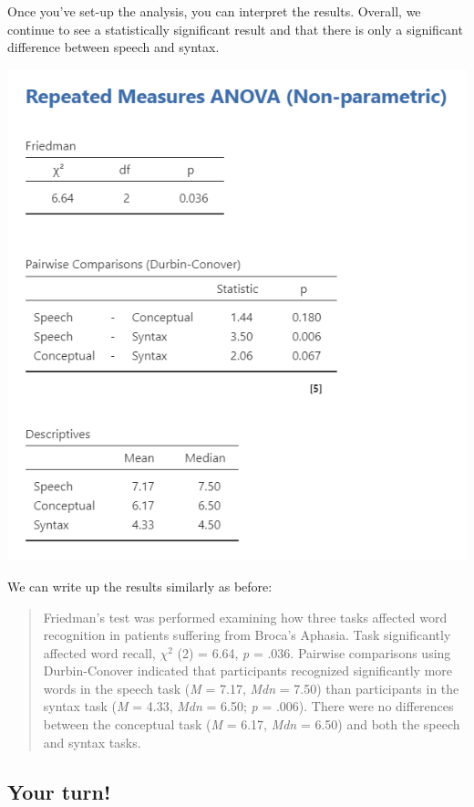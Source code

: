 \documentclass[
]{book}
\begin{document}
Once you've set-up the analysis, you can interpret the results. Overall, we continue to see a statistically significant result and that there is only a significant difference between speech and syntax.

\includegraphics{images/05-repeated-measures-anova/rm-anova_friedman.png}

We can write up the results similarly as before:

\begin{quote}
Friedman's test was performed examining how three tasks affected word recognition in patients suffering from Broca's Aphasia. Task significantly affected word recall, \(\chi^2\) (2) = 6.64, \emph{p} = .036. Pairwise comparisons using Durbin-Conover indicated that participants recognized significantly more words in the speech task (\emph{M} = 7.17, \emph{Mdn} = 7.50) than participants in the syntax task (\emph{M} = 4.33, \emph{Mdn} = 6.50; \emph{p} = .006). There were no differences between the conceptual task (\emph{M} = 6.17, \emph{Mdn} = 6.50) and both the speech and syntax tasks.
\end{quote}

\hypertarget{your-turn-7}{%
\subsection{Your turn!}\label{your-turn-7}}
\end{document}
